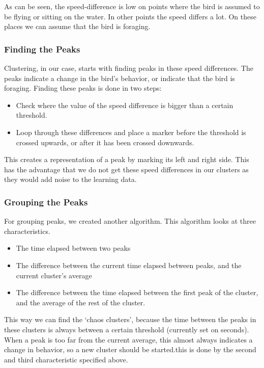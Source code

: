 
As can be seen, the speed-difference is low on points where the bird is assumed
to be flying or sitting on the water. In other points the speed differs a lot.
On these places we can assume that the bird is foraging.


\subsubsection{Finding the Peaks}
 Clustering, in our case, starts with finding peaks in these speed differences.
 The peaks indicate a change in the bird's behavior, or indicate that the bird
 is foraging. Finding these peaks is done in two steps:

 \begin{itemize}
    \item Check where the value of the speed difference is bigger than a certain
    threshold.
    \item Loop through these differences and place a marker before the threshold
    is crossed upwards, or after it has been crossed downwards. 
 \end{itemize}
 
 This creates a representation of a peak by marking its left and right side.
 This has the advantage that we do not get these speed differences in our
 clusters as they would add noise to the learning data.

 \subsubsection{Grouping the Peaks}
 For grouping peaks, we created another algorithm. This algorithm looks at three
 characteristics.  
 \begin{itemize}
 \item The time elapsed between two peaks
 \item The difference between the current time elapsed between peaks, and the
 current cluster's average
 \item The difference between the time elapsed between the first peak of the
 cluster, and the average of the rest of the cluster.
 \end{itemize}
 This way we can find the `chaos clusters', because the time between the peaks
 in these clusters is always between a certain threshold (currently set on
 \timeThreshold seconds). 
 When a peak is too far from the  current average, this almost always indicates
 a change in behavior, so a new cluster should be started.this is done by the
 second and third characteristic specified above.

